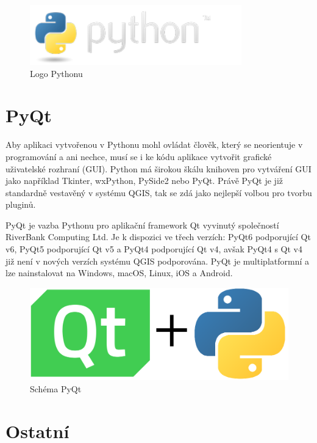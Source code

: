 \begin{figure}[H] \centering
    \includegraphics[width=260pt]{./pictures/python-logo.png}
    \caption[Logo Pythonu]{Logo Pythonu \cite{python}}
	\label{fig:python-logo}                                
\end{figure} 

\section{PyQt}
Aby aplikaci vytvořenou v Pythonu mohl ovládat člověk, který se neorientuje v programování a ani nechce,
musí se i ke kódu aplikace vytvořit grafické uživatelské rozhraní (GUI). Python má širokou škálu knihoven
pro vytváření GUI jako například Tkinter, wxPython, PySide2 nebo PyQt. Právě PyQt je již standardně 
vestavěný v systému QGIS, tak se zdá jako nejlepší volbou pro tvorbu pluginů.  

PyQt je vazba Pythonu pro aplikační framework Qt vyvinutý společností RiverBank Computing Ltd.
Je k dispozici ve třech verzích: PyQt6 podporující Qt v6, PyQt5 podporující Qt v5 a PyQt4 podporující Qt v4,
avšak PyQt4 s Qt v4 již není v nových verzích systému QGIS podporována. PyQt je multiplatformní a lze nainstalovat na Windows,
macOS, Linux, iOS a Android. \cite{pyqt}

\begin{figure}[H] \centering
    \includegraphics[width=400pt]{./pictures/pyqt.png}
    \caption[Schéma PyQt Pythonu]{Schéma PyQt}
	\label{fig:pyqt}                                
\end{figure} 

\section{Ostatní}

